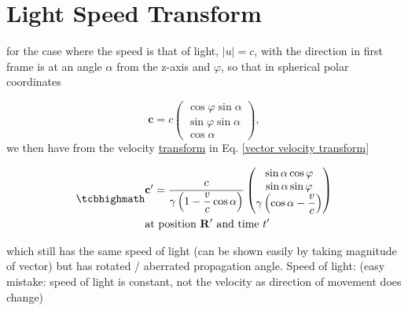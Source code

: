 \section{Light Speed Transform}
for the case where the speed is that of light, $|u|=c$, with the direction in first frame is at an angle $\alpha$ from the z-axis and $\varphi$, so that in spherical polar coordinates

\begin{equation}%
    \mathbf{c} = c \begin{pmatrix}
    \cos{\varphi}\sin{\alpha}\\ \sin{\varphi}\sin{\alpha} \\ \cos{\alpha}
    \end{pmatrix},
\end{equation}%
we then have from the velocity \hyperlink{def-transform}{transform} in Eq. \eqref{vector velocity transform}


\begin{equation}%
\label{light speed velocity transform}
\mhl{
\begin{aligned}
     &\mathbf{c'} = \dfrac{c}{\gamma\left(1- \dfrac{v}{c} \cos\alpha\right) }\begin{pmatrix}
    \sin\alpha\cos\varphi  \\ \sin\alpha\sin\varphi  \\ \gamma \left( \cos\alpha  - \dfrac{v}{c}  \right) \\
    \end{pmatrix}  \\
    &\text{at position $\mathbf{R'}$ and time $t'$ } 
\end{aligned}      
    }
\end{equation}%

which still has the same speed of light (can be shown easily by taking magnitude of vector) but has rotated / aberrated propagation angle. \newline
Speed of light: (easy mistake: speed of light is constant, not the velocity as direction of movement does change)\newline



